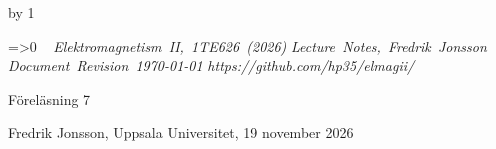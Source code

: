 {{{{{\cleardoublepage
%
%
%
%
%
%
%
\def\coursename{Elektromagnetism II}
\def\coursecode{1TE626}
\def\courseyear{2026}
\def\courserepo{https://github.com/hp35/elmagii/}
\def\lecturenumber{7}
\def\lecturetitle{Magnetiska f{\"a}lt i material}
\def\lecturesubtitle{}
\def\lectureauthor{Fredrik Jonsson}
\def\lectureplace{Uppsala Universitet}
\def\lecturedate{19 november 2026}
\edef\expandedlecturenumber{7}
\def\ifempty#1{\ifx\relax#1\relax}
\advance\chapno by 1
\immediate{}
\hsize=150mm\hoffset=4.6mm\vsize=230mm\voffset=7mm
\topskip=0pt\baselineskip=12pt\parskip=0pt\leftskip=0pt\parindent=15pt
\ifcolors
  \voffset=-10.2mm\topskip=0pt
\fi
\headline={\ifnum\secno>0\ifodd\pageno\rightheadline\else\leftheadline\fi
  \else\hfill\fi}
\def\rightheadline{\tenrm{\it F\"orel\"asning 7}
  \hfil{\it \coursename, \coursecode\ (\courseyear)}}
\def\leftheadline{\tenrm{\it \coursename, \coursecode\ (\courseyear)}
  \hfil{\it F\"orel\"asning 7}}
\noindent~\vskip-60pt\hskip-40pt{}
\vskip-42pt\hfill\vbox{
    \hbox{{\it \coursename, \coursecode\ (\courseyear)}}
    \hbox{{\it Lecture Notes, \lectureauthor}}
    \hbox{{\it Document Revision \today}}
    \hbox{{\it \courserepo}}}\vskip 36pt
\centerline{\twelvesc F\"orel\"asning 7}
\vskip 24pt\noindent
\centerline{}
\expandafter\ifempty\expandafter{\lecturesubtitle}%
  \else\centerline{\twelvesc\lecturesubtitle}\fi
\bigskip
\centerline{\lectureauthor, \lectureplace, \lecturedate}
\vskip24pt



}}}}}
